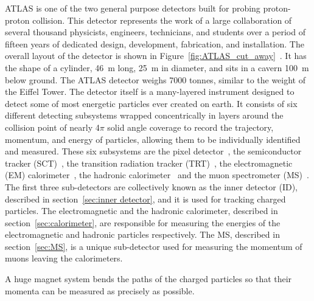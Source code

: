 ATLAS is one of the two general purpose detectors built for probing proton-proton 
collision. This detector represents the work of a large collaboration 
of several thousand physicists, engineers, technicians,
and students over a period of fifteen years of dedicated 
design, development, fabrication, and installation.
The overall layout of the detector is shown in Figure~\ref{fig:ATLAS_cut_away}~\cite{PERF-2007-01}.
It has the shape of a cylinder, 46~m long, 25~m in diameter, 
and sits in a cavern 100~m below ground. The ATLAS detector weighs 7000 tonnes, 
similar to the weight of the Eiffel Tower.
The detector itself is a many-layered instrument designed to detect some 
of most energetic particles ever created on earth. 
It consists of six different detecting subsystems wrapped concentrically 
in layers around the collision point of nearly 4$\pi$ solid angle coverage
to record the trajectory, momentum, and energy of particles, 
allowing them to be individually identified and measured. 
These six subsystems are 
the pixel detector~\cite{ATLAS-TDR-11}, 
the semiconductor tracker (SCT)~\cite{ATLAS-TDR-04}, 
the transition radiation tracker (TRT)~\cite{ATLAS-TDR-04},
the electromagnetic (EM) calorimeter~\cite{ATLAS-TDR-02}, 
the hadronic calorimeter~\cite{ATLAS-TDR-03}
and the muon spectrometer (MS)~\cite{ATLAS-TDR-10}.
The first three sub-detectors are collectively known as the inner detector (ID),
described in section~\ref{sec:inner detector}, and it is used for tracking charged particles. 
The electromagnetic and the hadronic calorimeter, described in section~\ref{sec:calorimeter},
are responsible for measuring the energies of the electromagnetic and hadronic particles respectively. 
The MS, described in section~\ref{sec:MS}, is a unique sub-detector used for measuring the 
momentum of muons leaving the calorimeters.

A huge magnet system bends the paths of the charged particles so that their 
momenta can be measured as precisely as possible.

